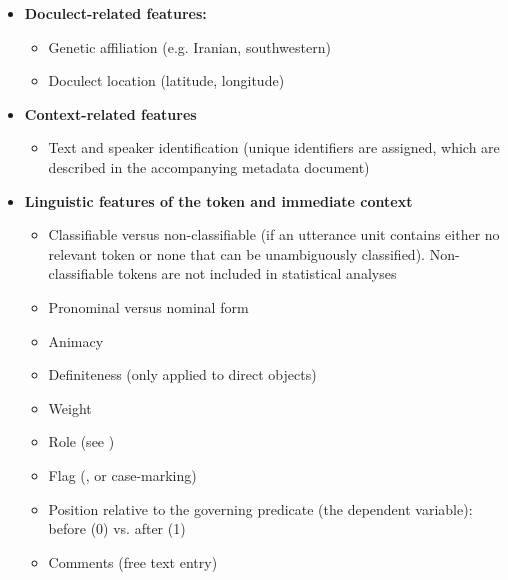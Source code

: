 \documentclass[output=paper,colorlinks,citecolor=brown,collectionchapter]{langscibook}
\begin{document}
\begin{sloppypar}
\begin{itemize}
    \item[] \textbf{Doculect-related features:}
    \begin{itemize}
        \item Genetic affiliation (e.g. Iranian, southwestern)
        \item Doculect location (latitude, longitude)
    \end{itemize}
    \item[] \textbf{Context-related features}
    \begin{itemize}
        \item Text and speaker identification (unique identifiers are assigned, which are described in the accompanying metadata document)
    \end{itemize}
    \newpage
    \item[] \textbf{Linguistic features of the token and immediate context}
    \begin{itemize}
        \item Classifiable versus non-classifiable (if an utterance unit contains either no relevant token or none that can be unambiguously classified). Non-classifiable tokens are not included in statistical analyses
        \item Pronominal versus nominal form
        \item Animacy
        \item Definiteness (only applied to direct objects)
        \item Weight
        \item Role (see )
        \item Flag (, or case-marking)
        \item Position relative to the governing predicate (the dependent variable): before (0) vs. after (1)
        \item Comments (free text entry)
    \end{itemize}
\end{itemize}
\end{sloppypar}
\end{document}
